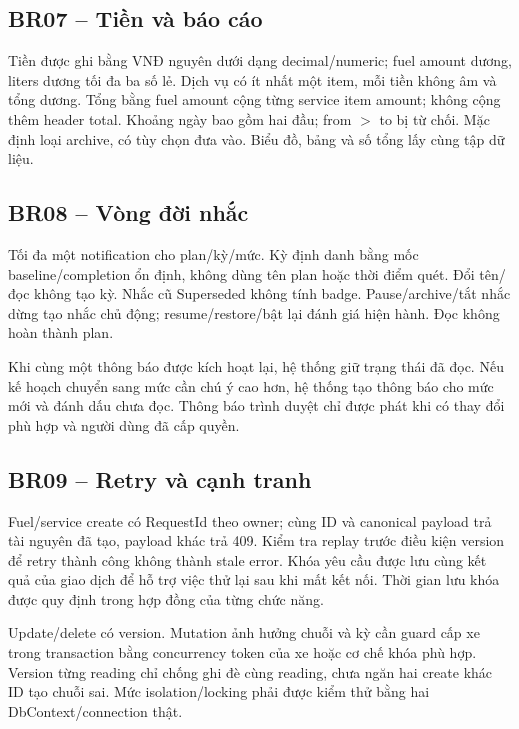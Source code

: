 \subsection{BR07 -- Tiền và báo cáo}
Tiền được ghi bằng VNĐ nguyên dưới dạng decimal/numeric; fuel amount dương, liters dương tối đa ba số lẻ. Dịch vụ có ít nhất một item, mỗi tiền không âm và tổng dương. Tổng bằng fuel amount cộng từng service item amount; không cộng thêm header total. Khoảng ngày bao gồm hai đầu; from $>$ to bị từ chối. Mặc định loại archive, có tùy chọn đưa vào. Biểu đồ, bảng và số tổng lấy cùng tập dữ liệu.
\subsection{BR08 -- Vòng đời nhắc}
Tối đa một notification cho plan/kỳ/mức. Kỳ định danh bằng mốc baseline/completion ổn định, không dùng tên plan hoặc thời điểm quét. Đổi tên/đọc không tạo kỳ. Nhắc cũ Superseded không tính badge. Pause/archive/tắt nhắc dừng tạo nhắc chủ động; resume/restore/bật lại đánh giá hiện hành. Đọc không hoàn thành plan.

Khi cùng một thông báo được kích hoạt lại, hệ thống giữ trạng thái đã đọc. Nếu kế hoạch chuyển sang mức cần chú ý cao hơn, hệ thống tạo thông báo cho mức mới và đánh dấu chưa đọc. Thông báo trình duyệt chỉ được phát khi có thay đổi phù hợp và người dùng đã cấp quyền.
\subsection{BR09 -- Retry và cạnh tranh}
Fuel/service create có RequestId theo owner; cùng ID và canonical payload trả tài nguyên đã tạo, payload khác trả 409. Kiểm tra replay trước điều kiện version để retry thành công không thành stale error. Khóa yêu cầu được lưu cùng kết quả của giao dịch để hỗ trợ việc thử lại sau khi mất kết nối. Thời gian lưu khóa được quy định trong hợp đồng của từng chức năng.

Update/delete có version. Mutation ảnh hưởng chuỗi và kỳ cần guard cấp xe trong transaction bằng concurrency token của xe hoặc cơ chế khóa phù hợp. Version từng reading chỉ chống ghi đè cùng reading, chưa ngăn hai create khác ID tạo chuỗi sai. Mức isolation/locking phải được kiểm thử bằng hai DbContext/connection thật.

